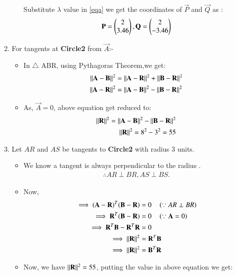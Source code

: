 \documentclass[journal,12pt,twocolumn]{IEEEtran}
\begin{document}
\begin{enumerate}
\begin{itemize}
Substitute $\lambda$  value in \eqref{eqa} we get the coordinates of $\vec{P}$ and  $\vec{Q}$ as :
\begin{align}
\mathbf{P}=\begin{pmatrix}2\\3.46\end{pmatrix},
\mathbf{Q}=\begin{pmatrix}2\\-3.46\end{pmatrix}
\end{align}
\end{itemize}

\item For tangents at \textbf{Circle2} from $\vec{A}$:-
\begin{itemize}
\item In $\triangle$ ABR, using Pythagoras Theorem,we get:
\begin{align}
    \lVert\mathbf{A}-\mathbf{B}\rVert^2 &= \lVert\mathbf{A}-\mathbf{R}\rVert^2+ \lVert\mathbf{B}-\mathbf{R}\rVert^2
    \\
    \lVert\mathbf{A}-\mathbf{R}\rVert^2 &=\lVert\mathbf{A}-\mathbf{B}\rVert^2 - \lVert\mathbf{B}-\mathbf{R}\rVert^2
    \end{align}
    \item As, $\vec{A}=0$, above equation get reduced to:
    \begin{align}
    \lVert\mathbf{R}\rVert^2 = \lVert\mathbf{A}-\mathbf{B}\rVert^2 - \lVert\mathbf{B}-\mathbf{R}\rVert^2 
    \\
    \lVert\mathbf{R}\rVert^2= 8^2 -3^2=55 \label{eqc}
\end{align}
\end{itemize}
\item Let $AR$ and $AS$  be tangents to \textbf{Circle2} with radius 3 units.
\begin{itemize}
\item We know a tangent is always perpendicular to the radius .
\begin{align}
\therefore AR \perp BR ,  AS \perp BS.
\end{align}
\item Now,
\begin{align}
 \implies (\mathbf{A}-\mathbf{R})^T (\mathbf{B}-\mathbf{R}) &= 0 \quad \left(\because AR \perp BR \right)
 \\
 \implies\mathbf{R}^T(\mathbf{B}-\mathbf{R})&= 0 \quad \left(\because \mathbf{A}=0\right)
 \\
  \implies\mathbf{R}^T \mathbf{B} - \mathbf{R}^T \mathbf{R} &= 0  
  \\
  \implies\lVert\mathbf{R}\rVert^2 &= \mathbf{R}^T \mathbf{B}
  \\
 \implies \lVert\mathbf{R}\rVert^2 &= \mathbf{B}^T \mathbf{R} 
  \end{align}
  \item Now, we have $\lVert\mathbf{R}\rVert^2 =55$, putting the value in above equation we get:

\end{itemize}
\end{enumerate}
\end{document}
